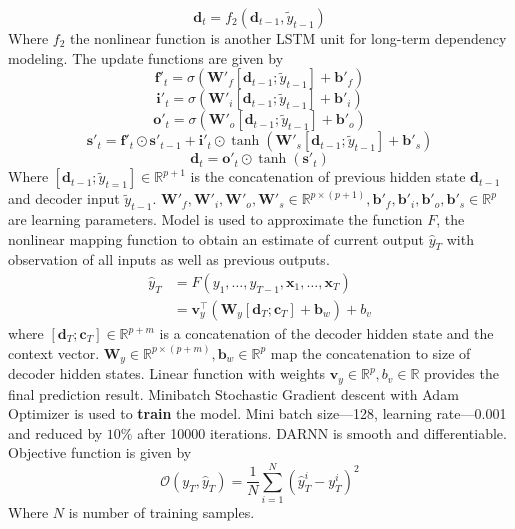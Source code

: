 \documentclass{article}
\begin{document}
\begin{equation}
    \textbf{d}_{t} = f_{2}(\textbf{d}_{t-1}, \tilde{y}_{t-1})
\end{equation}
Where $f_{2}$ the nonlinear function is another LSTM unit for long-term dependency modeling. The update functions are given by
\begin{equation}
    \textbf{f}'_{t} = \sigma(\textbf{W}'_{f}[\textbf{d}_{t-1}; \tilde{y}_{t-1}] + \textbf{b}'_{f})
\end{equation}
\begin{equation}
    \textbf{i}'_{t} = 
    \sigma(\textbf{W}'_{i}[\textbf{d}_{t-1}; \tilde{y}_{t-1}] + \textbf{b}'_{i})
\end{equation}
\begin{equation}
    \textbf{o}'_{t} = 
    \sigma(\textbf{W}'_{o}[\textbf{d}_{t-1}; \tilde{y}_{t-1}] + \textbf{b}'_{o})
\end{equation}
\begin{equation}
    \textbf{s}'_{t} = \textbf{f}'_{t} \odot \textbf{s}'_{t-1} + \textbf{i}'_{t} \odot \tanh(\textbf{W}'_{s}[\textbf{d}_{t-1}; \tilde{y}_{t-1}] + \textbf{b}'_{s})
\end{equation}
\begin{equation}
    \textbf{d}_{t} = \textbf{o}'_{t} \odot \tanh(\textbf{s}'_{t})
\end{equation}
Where $[\textbf{d}_{t-1}; \tilde{y}_{t=1}] \in \mathbb{R}^{p+1}$ is the concatenation of previous hidden state $\textbf{d}_{t-1}$ and decoder input $\tilde{y}_{t-1}$. $\textbf{W}'_{f}, \textbf{W}'_{i}, \textbf{W}'_{o}, \textbf{W}'_{s} \in \mathbb{R}^{p\times(p+1)}, \textbf{b}'_{f}, \textbf{b}'_{i}, \textbf{b}'_{o}, \textbf{b}'_{s} \in \mathbb{R}^{p}$ are learning parameters.
\newpage \noindent
Model is used to approximate the function $F$, the nonlinear mapping function to obtain an estimate of current output $\hat{y}_{T}$ with observation of all inputs as well as previous outputs.
\begin{equation}
\begin{aligned}
    \hat{y}_{T} &= F(y_{1}, \hdots, y_{T-1}, \textbf{x}_{1}, \hdots , 
    \textbf{x}_{T})\\
    &= \textbf{v}_{y}^{\intercal}(\textbf{W}_{y}[\textbf{d}_{T}; \textbf{c}_{T}] + \textbf{b}_{w}) + b_{v}
\end{aligned}
\end{equation}
where $[\textbf{d}_{T}; \textbf{c}_{T}] \in \mathbb{R}^{p+m}$ is a concatenation of the decoder hidden state and the context vector. $\textbf{W}_{y} \in \mathbb{R}^{p \times (p+m)}, \textbf{b}_{w} \in \mathbb{R}^{p}$ map the concatenation to size of decoder hidden states. Linear function with weights $\textbf{v}_{y} \in \mathbb{R}^{p}, b_{v} \in \mathbb{R}$ provides the final prediction result. \newline
Minibatch Stochastic Gradient descent with Adam Optimizer is used to \textbf{train} the model. Mini batch size---128, learning rate---0.001 and reduced by $10\%$ after 10000 iterations. DARNN is smooth and differentiable. Objective function is given by
\begin{equation}
    \mathcal{O}(y_{T}, \hat{y}_{T}) = \frac{1}{N} \sum_{i=1}^{N}(\hat{y}_{T}^{i} - y_{T}^{i})^{2}
\end{equation}
Where $N$ is number of training samples. 
\end{document}
